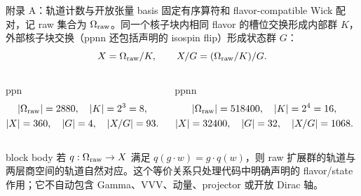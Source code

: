 \documentclass[aspectratio=169,UTF8,fontset=fandol]{ctexbeamer}
\begin{document}
\appendix
\begin{frame}{附录 A：轨道计数与开放张量 basis}
\small
固定有序算符和 flavor-compatible Wick 配对，记 raw 集合为
\(\Omega_{\rm raw}\)。同一个核子块内相同 flavor 的槽位交换形成内部群
\(K\)，外部核子块交换（ppnn 还包括声明的 isospin flip）形成状态群
\(G\)：
\[
 X=\Omega_{\rm raw}/K,\qquad X/G=(\Omega_{\rm raw}/K)/G .
\]
\begin{columns}[T,onlytextwidth]
\begin{block}{ppn}
\scriptsize
\[
\begin{gathered}
 |\Omega_{\rm raw}|=2880,\quad |K|=2^3=8,\\
 |X|=360,\quad |G|=4,\quad |X/G|=93 .
\end{gathered}
\]
\end{block}
\begin{block}{ppnn}
\scriptsize
\[
\begin{gathered}
 |\Omega_{\rm raw}|=518400,\quad |K|=2^4=16,\\
 |X|=32400,\quad |G|=32,\quad |X/G|=1068 .
\end{gathered}
\]
\end{block}
\end{columns}
\vspace{0.25em}
\begin{beamercolorbox}[sep=0.45em,wd=\linewidth]{block body}
\scriptsize
若 \(q:\Omega_{\rm raw}\to X\) 满足 \(q(g\cdot w)=g\cdot q(w)\)，则 raw 扩展群的轨道与两层商空间的轨道自然对应。这个等价关系只处理代码中明确声明的 flavor/state 作用；它不自动包含 Gamma、VVV、动量、projector 或开放 Dirac 轴。
\end{beamercolorbox}
\end{frame}
\end{document}
